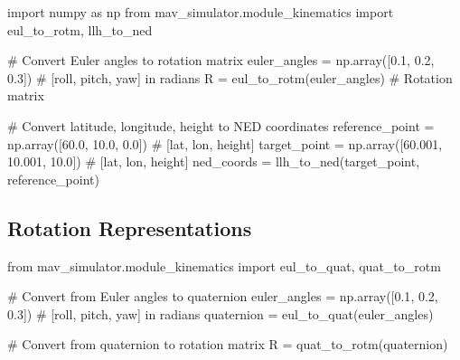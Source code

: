 \documentclass[
  letterpaper,
  DIV=11,
  numbers=noendperiod]{scrreprt}
\newenvironment{Shaded}{\begin{snugshade}}{\end{snugshade}}
\newcommand{\CommentTok}[1]{\textcolor[rgb]{0.37,0.37,0.37}{#1}}
\newcommand{\FloatTok}[1]{\textcolor[rgb]{0.68,0.00,0.00}{#1}}
\newcommand{\ImportTok}[1]{\textcolor[rgb]{0.00,0.46,0.62}{#1}}
\newcommand{\NormalTok}[1]{\textcolor[rgb]{0.00,0.23,0.31}{#1}}
\newcommand{\OperatorTok}[1]{\textcolor[rgb]{0.37,0.37,0.37}{#1}}
\begin{document}
\begin{Shaded}
\begin{Highlighting}[]
\ImportTok{import}\NormalTok{ numpy }\ImportTok{as}\NormalTok{ np}
\ImportTok{from}\NormalTok{ mav\_simulator.module\_kinematics }\ImportTok{import}\NormalTok{ eul\_to\_rotm, llh\_to\_ned}

\CommentTok{\# Convert Euler angles to rotation matrix}
\NormalTok{euler\_angles }\OperatorTok{=}\NormalTok{ np.array([}\FloatTok{0.1}\NormalTok{, }\FloatTok{0.2}\NormalTok{, }\FloatTok{0.3}\NormalTok{])  }\CommentTok{\# [roll, pitch, yaw] in radians}
\NormalTok{R }\OperatorTok{=}\NormalTok{ eul\_to\_rotm(euler\_angles)  }\CommentTok{\# Rotation matrix}

\CommentTok{\# Convert latitude, longitude, height to NED coordinates}
\NormalTok{reference\_point }\OperatorTok{=}\NormalTok{ np.array([}\FloatTok{60.0}\NormalTok{, }\FloatTok{10.0}\NormalTok{, }\FloatTok{0.0}\NormalTok{])  }\CommentTok{\# [lat, lon, height]}
\NormalTok{target\_point }\OperatorTok{=}\NormalTok{ np.array([}\FloatTok{60.001}\NormalTok{, }\FloatTok{10.001}\NormalTok{, }\FloatTok{10.0}\NormalTok{])  }\CommentTok{\# [lat, lon, height]}
\NormalTok{ned\_coords }\OperatorTok{=}\NormalTok{ llh\_to\_ned(target\_point, reference\_point)}
\end{Highlighting}
\end{Shaded}

\subsection*{Rotation Representations}\label{rotation-representations}

\begin{Shaded}
\begin{Highlighting}[]
\ImportTok{from}\NormalTok{ mav\_simulator.module\_kinematics }\ImportTok{import}\NormalTok{ eul\_to\_quat, quat\_to\_rotm}

\CommentTok{\# Convert from Euler angles to quaternion}
\NormalTok{euler\_angles }\OperatorTok{=}\NormalTok{ np.array([}\FloatTok{0.1}\NormalTok{, }\FloatTok{0.2}\NormalTok{, }\FloatTok{0.3}\NormalTok{])  }\CommentTok{\# [roll, pitch, yaw] in radians}
\NormalTok{quaternion }\OperatorTok{=}\NormalTok{ eul\_to\_quat(euler\_angles)}

\CommentTok{\# Convert from quaternion to rotation matrix}
\NormalTok{R }\OperatorTok{=}\NormalTok{ quat\_to\_rotm(quaternion)}
\end{Highlighting}
\end{Shaded}
\end{document}
